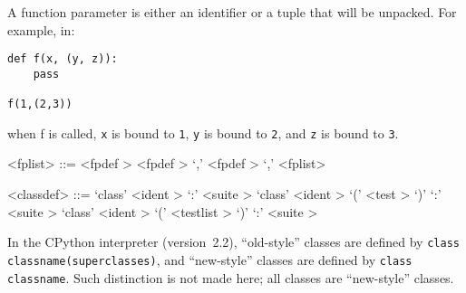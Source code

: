 A function parameter is either an identifier or a tuple that will be unpacked.  For example, in:
\begin{verbatim}
def f(x, (y, z)):
    pass

f(1,(2,3))
\end{verbatim}
when f is called, \verb|x| is bound to \verb|1|, \verb|y| is bound to \verb|2|, and
\verb|z| is bound to \verb|3|. \\

\label{fplistb}

\begin{grammar}
<fplist> ::= <fpdef \myref[fpdefb]>
	\alt <fpdef \myref[fpdefb]> `,'
	\alt <fpdef \myref[fpdefb]> `,' <fplist>
\end{grammar}


\label{classdefb}

\begin{grammar}
<classdef> ::= `class' <ident \myref[identb]> `:' <suite \myref[suiteb]>
	\alt `class' <ident \myref[identb]> `(' <test \myref[testb]> `)' `:' <suite \myref[suiteb]>
	\alt `class' <ident \myref[identb]> `(' <testlist \myref[testlistb]> `)' `:' <suite \myref[suiteb]>
\end{grammar}


In the CPython interpreter (version~2.2), ``old-style'' classes are defined by
\verb+class classname(superclasses)+, and ``new-style'' classes are defined by 
\verb+class classname+.  Such distinction is not made here; all classes
are ``new-style'' classes.


